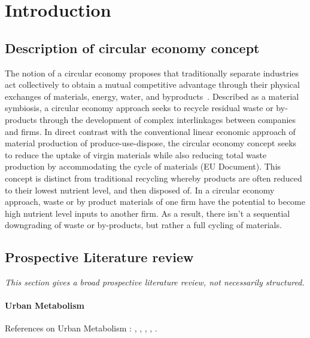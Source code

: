 \documentclass{article}
\begin{document}
\section{Introduction}


\subsection{Description of circular economy concept}

The notion of a circular economy proposes that traditionally separate industries act collectively to obtain a mutual competitive advantage through their physical exchanges of materials, energy, water, and byproducts~\cite{chertow2000industrial}. Described as a material symbiosis, a circular economy approach seeks to recycle residual waste or by-products through the development of complex interlinkages between companies and firms.  In direct contrast with the conventional linear economic approach of material production of produce-use-dispose, the circular economy concept seeks to reduce the uptake of virgin materials while also reducing total waste production by accommodating the cycle of materials (EU Document). This concept is distinct from traditional recycling whereby products are often reduced to their lowest nutrient level, and then disposed of. In a circular economy approach, waste or by product materials of one firm have the potential to become high nutrient level inputs to another firm. As a result, there isn’t a sequential downgrading of waste or by-products, but rather a full cycling of materials. 


\subsection{Prospective Literature review}


\textit{This section gives a broad prospective literature review, not necessarily structured.}

\paragraph{Urban Metabolism}

References on Urban Metabolism : \cite{kennedy2007changing}, \cite{kennedy2011study}, \cite{newcombe1978metabolism}, \cite{bodini2012cities}, \cite{hoornwegmainstreaming}.
\end{document}
